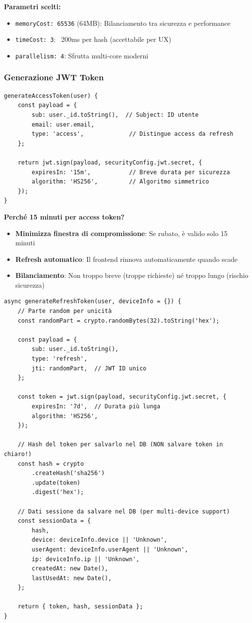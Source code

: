 \documentclass[11pt,a4paper]{article}
\newcommand{\code}[1]{\texttt{#1}}
\begin{document}
\textbf{Parametri scelti:}
\begin{itemize}
    \item \code{memoryCost: 65536} (64MB): Bilanciamento tra sicurezza e performance
    \item \code{timeCost: 3}: ~200ms per hash (accettabile per UX)
    \item \code{parallelism: 4}: Sfrutta multi-core moderni
\end{itemize}

\subsubsection{Generazione JWT Token}

\begin{lstlisting}[caption=Generazione Access Token]
generateAccessToken(user) {
    const payload = {
        sub: user._id.toString(),  // Subject: ID utente
        email: user.email,
        type: 'access',             // Distingue access da refresh
    };

    return jwt.sign(payload, securityConfig.jwt.secret, {
        expiresIn: '15m',           // Breve durata per sicurezza
        algorithm: 'HS256',         // Algoritmo simmetrico
    });
}
\end{lstlisting}

\textbf{Perché 15 minuti per access token?}
\begin{itemize}
    \item \textbf{Minimizza finestra di compromissione}: Se rubato, è valido solo 15 minuti
    \item \textbf{Refresh automatico}: Il frontend rinnova automaticamente quando scade
    \item \textbf{Bilanciamento}: Non troppo breve (troppe richieste) né troppo lungo (rischio sicurezza)
\end{itemize}

\begin{lstlisting}[caption=Generazione Refresh Token con Device Tracking]
async generateRefreshToken(user, deviceInfo = {}) {
    // Parte random per unicità
    const randomPart = crypto.randomBytes(32).toString('hex');

    const payload = {
        sub: user._id.toString(),
        type: 'refresh',
        jti: randomPart,  // JWT ID unico
    };

    const token = jwt.sign(payload, securityConfig.jwt.secret, {
        expiresIn: '7d',  // Durata più lunga
        algorithm: 'HS256',
    });

    // Hash del token per salvarlo nel DB (NON salvare token in chiaro!)
    const hash = crypto
        .createHash('sha256')
        .update(token)
        .digest('hex');

    // Dati sessione da salvare nel DB (per multi-device support)
    const sessionData = {
        hash,
        device: deviceInfo.device || 'Unknown',
        userAgent: deviceInfo.userAgent || 'Unknown',
        ip: deviceInfo.ip || 'Unknown',
        createdAt: new Date(),
        lastUsedAt: new Date(),
    };

    return { token, hash, sessionData };
}
\end{lstlisting}
\end{document}
